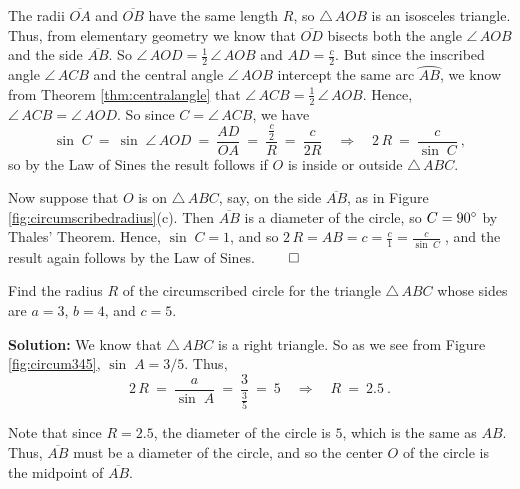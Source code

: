 The radii $\overline{OA}$ and $\overline{OB}$ have the same length $R$, so $\triangle\,AOB$ is an
isosceles triangle. Thus, from elementary geometry we know that $\overline{OD}$ bisects both the
angle $\angle\,AOB$ and the side $\overline{AB}$. So $\angle\,AOD = \frac{1}{2}\,\angle\,AOB$
and $AD = \frac{c}{2}$. But since the inscribed angle $\angle\,ACB$ and the central angle
$\angle\,AOB$ intercept the same arc $\wideparen{AB}$, we know from Theorem \ref{thm:centralangle}
that $\angle\,ACB = \frac{1}{2}\,\angle\,AOB$. Hence, $\angle\,ACB = \angle\,AOD$. So since $C =
\angle\,ACB$, we have
\begin{displaymath}
 \sin\;C ~=~ \sin\;\angle\,AOD ~=~ \frac{AD}{OA} ~=~ \frac{\frac{c}{2}}{R} ~=~ \frac{c}{2R}
 \quad\Rightarrow\quad 2\,R ~=~ \frac{c}{\sin\;C} ~,
\end{displaymath}
so by the Law of Sines the result follows if $O$ is inside or outside $\triangle\,ABC$.

Now suppose that $O$ is on $\triangle\,ABC$, say, on the side $\overline{AB}$, as in
Figure \ref{fig:circumscribedradius}(c). Then $\overline{AB}$ is a diameter of the circle, so
$C = 90^\circ$ by Thales' Theorem. Hence, $\sin\;C = 1$, and so
$2\,R = AB = c = \frac{c}{1} = \frac{c}{\sin\;C}\;$,
and the result again follows by the Law of Sines. $\qed$\vspace{-1mm}

\begin{exmp}
\piccaption[]{\label{fig:circum345}}
\noindent Find the radius $R$ of the circumscribed circle for the triangle $\triangle\,ABC$ whose sides are
 $a=3$, $b=4$, and $c=5$.\vspace{1mm}
 \par\noindent\textbf{Solution:} We know that $\triangle\,ABC$ is a right triangle. So as we see from
 Figure \ref{fig:circum345}, $\sin\;A = 3/5$. Thus,
 \begin{displaymath}
  2\,R ~=~ \frac{a}{\sin\;A} ~=~ \frac{3}{\frac{3}{5}} ~=~ 5 \quad\Rightarrow\quad
   \boxed{R ~=~ 2.5} ~.
 \end{displaymath}

\noindent Note that since $R =2.5$, the diameter of the circle is $5$, which is the same as
 $AB$. Thus, $\overline{AB}$ must be a diameter of the circle, and so the center
 $O$ of the circle is the midpoint of $\overline{AB}$.
\end{exmp}\vspace{-3mm}
\divider

